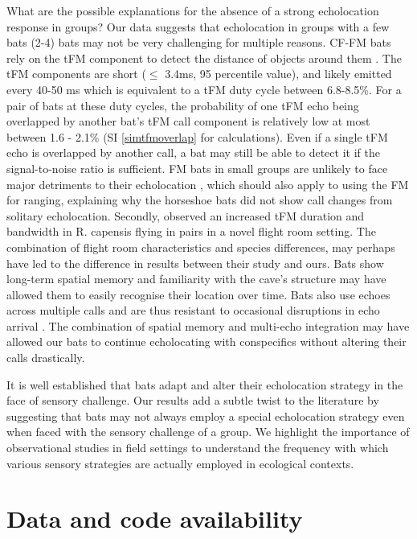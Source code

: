 \documentclass[
]{book}
\begin{document}
What are the possible explanations for the absence of a strong echolocation response in groups? Our data suggests that echolocation in groups with a few bats (2-4) bats may not be very challenging for multiple reasons. CF-FM bats rely on the tFM component to detect the distance of objects around them \citep{tian1997echolocation}. The tFM components are short (\(\leq\) 3.4ms, 95 percentile value), and likely emitted every 40-50 ms which is equivalent to a tFM duty cycle between 6.8-8.5\%. For a pair of bats at these duty cycles, the probability of one tFM echo being overlapped by another bat's tFM call component is relatively low at most between 1.6 - 2.1\% (SI \ref{simtfmoverlap} for calculations). Even if a single tFM echo is overlapped by another call, a bat may still be able to detect it if the signal-to-noise ratio is sufficient. FM bats in small groups are unlikely to face major detriments to their echolocation \citep{beleyur2019modeling}, which should also apply to using the FM for ranging, explaining why the horseshoe bats did not show call changes from solitary echolocation. Secondly, \citet{fawcett2015echolocation} observed an increased tFM duration and bandwidth in R. capensis flying in pairs in a novel flight room setting. The combination of flight room characteristics \citep{surlykke2009.dirn} and species differences, may perhaps have led to the difference in results between their study and ours. Bats show long-term spatial memory \citep{barchi2013spatial, mohres1949versuche} and familiarity with the cave's structure may have allowed them to easily recognise their location over time. Bats also use echoes across multiple calls and are thus resistant to occasional disruptions in echo arrival \citep{Salles202011719}. The combination of spatial memory and multi-echo integration may have allowed our bats to continue echolocating with conspecifics without altering their calls drastically.

It is well established that bats adapt and alter their echolocation strategy in the face of sensory challenge. Our results add a subtle twist to the literature by suggesting that bats may not always employ a special echolocation strategy even when faced with the sensory challenge of a group. We highlight the importance of observational studies in field settings to understand the frequency with which various sensory strategies are actually employed in ecological contexts.

\hypertarget{data-and-code-availability}{%
\section{Data and code availability}\label{data-and-code-availability}}
\end{document}
